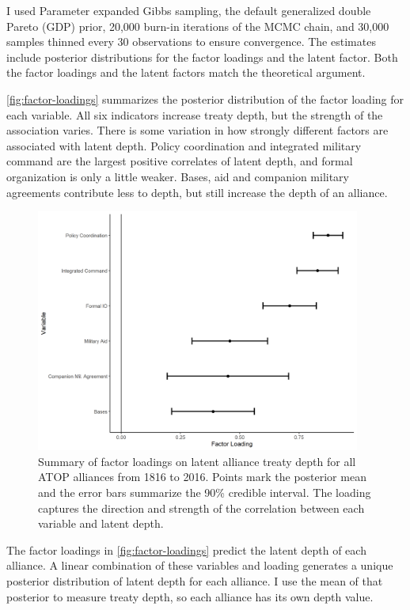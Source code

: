 \documentclass[12pt]{article}
\begin{document}
I used Parameter expanded Gibbs sampling, the default generalized double Pareto (GDP) prior, 20,000 burn-in iterations of the MCMC chain, and 30,000 samples thinned every 30 observations to ensure convergence. 
The estimates include posterior distributions for the factor loadings and the latent factor. 
Both the factor loadings and the latent factors match the theoretical argument. 


\autoref{fig:factor-loadings} summarizes the posterior distribution of the factor loading for each variable. 
All six indicators increase treaty depth, but the strength of the association varies. 
There is some variation in how strongly different factors are associated with latent depth. 
Policy coordination and integrated military command are the largest positive correlates of latent depth, and formal organization is only a little weaker.
Bases, aid and companion military agreements contribute less to depth, but still increase the depth of an alliance. 
 
 
\begin{figure}
	\centering
		\includegraphics[width=0.95\textwidth]{../figures/factor-loadings.png}
	\caption{Summary of factor loadings on latent alliance treaty depth for all ATOP alliances from 1816 to 2016. Points mark the posterior mean and the error bars summarize the 90\% credible interval. The loading captures the direction and strength of the correlation between each variable and latent depth.}
	\label{fig:factor-loadings}
\end{figure}


The factor loadings in \autoref{fig:factor-loadings} predict the latent depth of each alliance. 
A linear combination of these variables and loading generates a unique posterior distribution of latent depth for each alliance. 
I use the mean of that posterior to measure treaty depth, so each alliance has its own depth value. 
\end{document}
